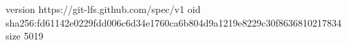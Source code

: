 version https://git-lfs.github.com/spec/v1
oid sha256:fd61142e0229fdd006c6d34e1760ca6b804d9a1219e8229c30f8636810217834
size 5019

